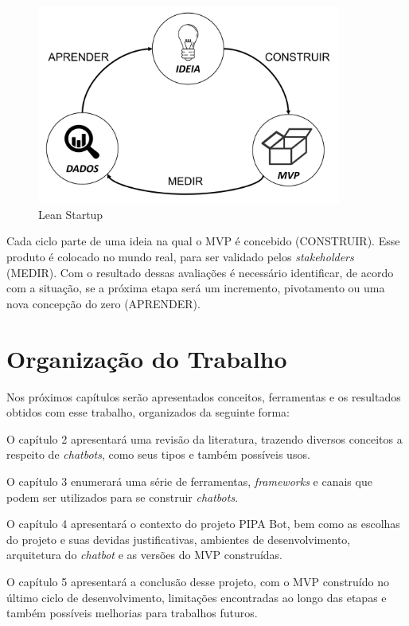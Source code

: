   \begin{figure}[h!]
  	\begin{center}
  		\includegraphics[width=10cm]{images/lean.png}
  		\caption{Lean Startup}
  	\end{center}
  \end{figure}

  Cada ciclo parte de uma ideia na qual o MVP é concebido (CONSTRUIR). Esse produto é colocado no mundo real, para ser validado pelos \textit{stakeholders} (MEDIR). Com o resultado dessas avaliações é necessário identificar, de acordo com a situação, se a próxima etapa será um incremento, pivotamento ou uma nova concepção do zero (APRENDER).
  
  \section{Organização do Trabalho}
  Nos próximos capítulos serão apresentados conceitos, ferramentas e os resultados obtidos com esse trabalho, organizados da seguinte forma:
  
  O capítulo 2 apresentará uma revisão da literatura, trazendo diversos conceitos a respeito de \emph{chatbots}, como seus tipos e também possíveis usos.
  
  O capítulo 3 enumerará uma série de ferramentas, \emph{frameworks} e canais que podem ser utilizados para se construir \emph{chatbots}.
  
  O capítulo 4 apresentará o contexto do projeto PIPA Bot, bem como as escolhas do projeto e suas devidas justificativas, ambientes de desenvolvimento, arquitetura do \emph{chatbot} e as versões do MVP construídas.
  
  O capítulo 5 apresentará a conclusão desse projeto, com o MVP construído no último ciclo de desenvolvimento, limitações encontradas ao longo das etapas e também possíveis melhorias para trabalhos futuros.
 